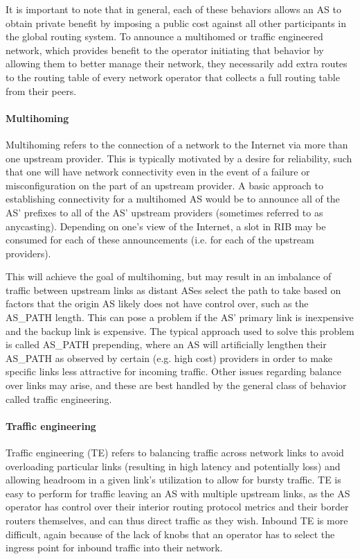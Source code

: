 It is important to note that in general, each of these behaviors allows an AS
to obtain private benefit by imposing a public cost against all other
participants in the global routing system. To announce a multihomed or traffic
engineered network, which provides benefit to the operator initiating that
behavior by allowing them to better manage their network, they necessarily add
extra routes to the routing table of every network operator that collects a
full routing table from their peers.

\paragraph{Multihoming}

Multihoming refers to the connection of a network to the Internet via more than
one upstream provider. This is typically motivated by a desire for reliability,
such that one will have network connectivity even in the event of a failure or
misconfiguration on the part of an upstream provider. A basic approach to
establishing connectivity for a multihomed AS would be to announce all of the
AS' prefixes to all of the AS' upstream providers (sometimes referred to as
anycasting). Depending on one's view of the Internet, a slot in RIB may be
consumed for each of these announcements (i.e. for each of the upstream
providers).

This will achieve the goal of multihoming, but may result in an imbalance of
traffic between upstream links as distant ASes select the path to take based on
factors that the origin AS likely does not have control over, such as the
AS\_PATH length. This can pose a problem if the AS' primary link is inexpensive
and the backup link is expensive. The typical approach used to solve this
problem is called AS\_PATH prepending, where an AS will artificially lengthen
their AS\_PATH as observed by certain (e.g. high cost) providers in order to
make specific links less attractive for incoming traffic. Other issues
regarding balance over links may arise, and these are best handled by the
general class of behavior called traffic engineering.

\paragraph{Traffic engineering}

Traffic engineering (TE) refers to balancing traffic across network links to
avoid overloading particular links (resulting in high latency and potentially
loss) and allowing headroom in a given link's utilization to allow for bursty
traffic. TE is easy to perform for traffic leaving an AS with multiple upstream
links, as the AS operator has control over their interior routing protocol
metrics and their border routers themselves, and can thus direct traffic as
they wish. Inbound TE is more difficult, again because of the lack of knobs
that an operator has to select the ingress point for inbound traffic into their
network.

